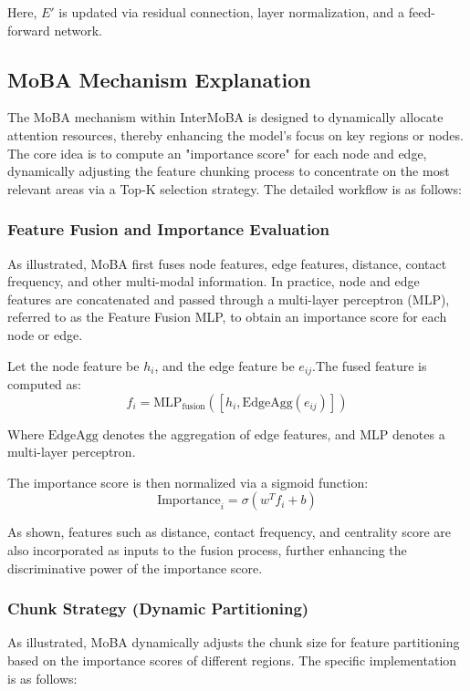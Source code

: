 \documentclass[11pt,a4paper]{article}
\begin{document}
Here, $E'$ is updated via residual connection, layer normalization, and
a feed-forward network.

\subsection{MoBA Mechanism Explanation}
The MoBA mechanism within InterMoBA is designed to dynamically allocate
attention resources, thereby enhancing the model's focus on key regions
or nodes. The core idea is to compute an "importance score" for each
node and edge, dynamically adjusting the feature chunking process to
concentrate on the most relevant areas via a Top-K selection strategy.
The detailed workflow is as follows:
\subsubsection{Feature Fusion and Importance Evaluation}
As illustrated, MoBA first fuses node features, edge features, distance,
contact frequency, and other multi-modal information. In practice, node
and edge features are concatenated and passed through a multi-layer
perceptron (MLP), referred to as the Feature Fusion MLP, to obtain an
importance score for each node or edge.

Let the node feature be $h_i$, and the edge feature be $e_{ij}$.The fused feature is computed as:
\begin{equation}
f_i = \text{MLP}_{\text{fusion}}\left(\left[h_i, \text{EdgeAgg}(e_{ij})\right]\right)
\end{equation}

Where $\text{EdgeAgg}$ denotes the aggregation of edge features, and MLP
denotes a multi-layer perceptron.

The importance score is then normalized via a sigmoid function:
\begin{equation}
\text{Importance}_i = \sigma(w^T f_i + b)
\end{equation}

As shown, features such as distance, contact frequency, and centrality
score are also incorporated as inputs to the fusion process, further
enhancing the discriminative power of the importance score.
\subsubsection{Chunk Strategy (Dynamic Partitioning)}
As illustrated, MoBA dynamically adjusts the chunk size for feature
partitioning based on the importance scores of different regions. The
specific implementation is as follows:
\end{document}
